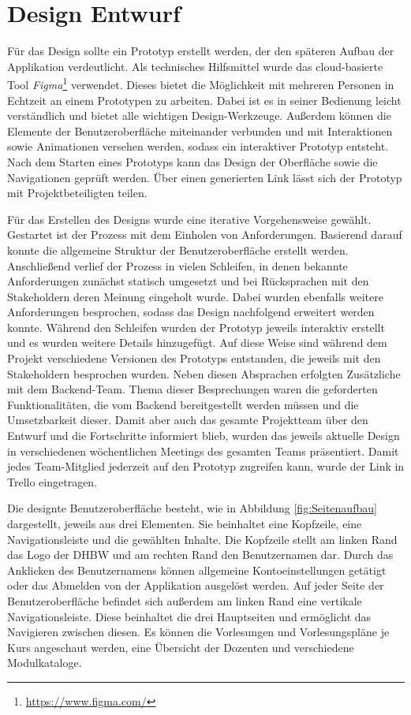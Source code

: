 \section{Design Entwurf}
Für das Design sollte ein Prototyp erstellt werden, der den späteren Aufbau der Applikation verdeutlicht.
Als technisches Hilfsmittel wurde das cloud-basierte Tool \textit{Figma}\footnote{\url{https://www.figma.com/}} verwendet.
Dieses bietet die Möglichkeit mit mehreren Personen in Echtzeit an einem Prototypen zu arbeiten.
Dabei ist es in seiner Bedienung leicht verständlich und bietet alle wichtigen Design-Werkzeuge. 
Außerdem können die Elemente der Benutzeroberfläche miteinander verbunden und mit Interaktionen sowie Animationen versehen werden, sodass ein interaktiver Prototyp entsteht.
Nach dem Starten eines Prototyps kann das Design der Oberfläche sowie die Navigationen geprüft werden.
Über einen generierten Link lässt sich der Prototyp mit Projektbeteiligten teilen. 

Für das Erstellen des Designs wurde eine iterative Vorgehensweise gewählt.  
Gestartet ist der Prozess mit dem Einholen von Anforderungen.
Basierend darauf konnte die allgemeine Struktur der Benutzeroberfläche erstellt werden.
Anschließend verlief der Prozess in vielen Schleifen, in denen bekannte Anforderungen zunächst statisch umgesetzt und bei Rücksprachen mit den Stakeholdern deren Meinung eingeholt wurde.
Dabei wurden ebenfalls weitere Anforderungen besprochen, sodass das Design nachfolgend erweitert werden konnte.
Während den Schleifen wurden der Prototyp jeweils interaktiv erstellt und es wurden weitere Details hinzugefügt.
Auf diese Weise sind während dem Projekt verschiedene Versionen des Prototyps entstanden, die jeweils mit den Stakeholdern besprochen wurden.
Neben diesen Absprachen erfolgten Zusätzliche mit dem Backend-Team.
Thema dieser Besprechungen waren die geforderten Funktionalitäten, die vom Backend bereitgestellt werden müssen und die Umsetzbarkeit dieser.
Damit aber auch das gesamte Projektteam über den Entwurf und die Fortschritte informiert blieb, wurden das jeweils aktuelle Design in verschiedenen wöchentlichen Meetings des gesamten Teams präsentiert.
Damit jedes Team-Mitglied jederzeit auf den Prototyp zugreifen kann, wurde der Link in Trello eingetragen. 

Die designte Benutzeroberfläche besteht, wie in Abbildung \ref{fig:Seitenaufbau} dargestellt, jeweils aus drei Elementen.
Sie beinhaltet eine Kopfzeile, eine Navigationsleiste und die gewählten Inhalte.
Die Kopfzeile stellt am linken Rand das Logo der \acs{DHBW} und am rechten Rand den Benutzernamen dar.
Durch das Anklicken des Benutzernamens können allgemeine Kontoeinstellungen getätigt oder das Abmelden von der Applikation ausgelöst werden.
Auf jeder Seite der Benutzeroberfläche befindet sich außerdem am linken Rand eine vertikale Navigationsleiste.
Diese beinhaltet die drei Hauptseiten und ermöglicht das Navigieren zwischen diesen.
Es können die Vorlesungen und Vorlesungspläne je Kurs angeschaut werden, eine Übersicht der Dozenten und verschiedene Modulkataloge. 

